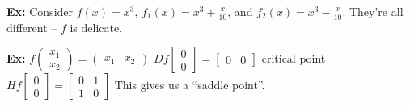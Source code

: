 \documentclass[10pt,letterpaper]{article}
\newcommand{\n}{\hfill\break}
\newcommand{\ex}[1]{\par\noindent\settowidth{\hangindent}{\textbf{Ex: }}\textbf{Ex: }#1\n}
\begin{document}
\ex{Consider $f(x)=x^{3}$, $f_{1}(x)=x^{3}+\frac{x}{10}$, and $f_{2}(x)=x^{3}-\frac{x}{10}$. They're all different -- $f$ is delicate.}

\ex{$f\left(\begin{array}{c}x_{1}\\ x_{2}\end{array}\right)=\left(\begin{array}{cc}x_{1} & x_{2}\end{array}\right)$\n
$Df\left[\begin{array}{c}0\\ 0\end{array}\right]=\left[\begin{array}{cc}0 & 0\end{array}\right]$ critical point\n
$Hf\left[\begin{array}{c}0\\ 0\end{array}\right]=\left[\begin{array}{cc}0 & 1\\ 1 & 0\end{array}\right]$\n
\n
This gives us a ``saddle point''.}
\end{document}
